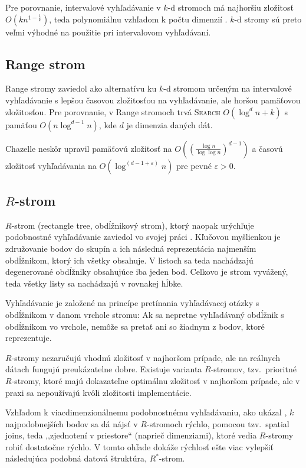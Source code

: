 \documentclass[12pt,a4paper,oneside]{article}
\begin{document}
{Pre porovnanie, intervalové vyhľadávanie v $k$-d stromoch má najhoršiu zložitosť $O(kn^{1-\frac{1}{k}})$, teda polynomiálnu vzhľadom k počtu dimenzií \citep{lee77}. $k$-d stromy sú preto veľmi výhodné na použitie pri intervalovom vyhľadávaní.

\subsection{Range strom}\label{rangetree}

Range stromy zaviedol \citet{Bentley79} ako alternatívu ku $k$-d stromom určeným na intervalové vyhľadávanie s lepšou časovou zložitosťou na vyhľadávanie, ale horšou pamäťovou zložitosťou. Pre porovnanie, v Range stromoch trvá \textsc{Search} $O(\log^d n + k)$ s pamäťou $O(n \log^{d-1} n)$, kde $d$ je dimenzia daných dát.

Chazelle neskôr upravil pamäťovú zložitosť na $O\left(\left(\frac{\log n}{\log \log n}\right)^{d-1}\right)$\citep{chazelle90p1}
a časovú zložitosť vyhľadávania na $O(\log^{(d-1+\varepsilon)} n)$\citep{chazelle90p2} pre pevné $\varepsilon > 0$.

\subsection{$R$-strom}\label{rtree}

$R$-strom (rectangle tree, obdĺžnikový strom), ktorý naopak urýchľuje podobnostné vyhľadávanie zaviedol vo svojej práci \citet{Guttman84}.
Kľučovou myšlienkou je združovanie bodov do skupín a ich následná reprezentácia najmenším obdĺžnikom, ktorý ich všetky obsahuje. V listoch sa teda nachádzajú degenerované obdĺžniky obsahujúce iba jeden bod. Celkovo je strom vyvážený, teda všetky listy sa nachádzajú v rovnakej hĺbke.

Vyhľadávanie je založené na princípe pretínania vyhľadávacej otázky s obdĺžnikom v danom vrchole stromu: Ak sa nepretne vyhľadávaný obdĺžnik s obdĺžnikom vo vrchole, nemôže sa pretať ani so žiadnym z bodov, ktoré reprezentuje.

$R$-stromy nezaručujú vhodnú zložitosť v najhoršom prípade, ale na reálnych dátach fungujú preukázatelne \citep{Hwang03} dobre. Existuje varianta $R$-stromov, tzv.~prioritné $R$-stromy, ktoré majú dokazateľne optimálnu zložitosť v najhoršom prípade, ale v praxi sa nepoužívajú kvôli zložitosti implementácie.

Vzhľadom k viacdimenzionálnemu podobnostnému vyhľadávaniu, ako ukázal \citet{brinkhoff93}, 
$k$ najpodobnejších bodov sa dá nájsť v $R$-stromoch rýchlo, pomocou tzv.~spatial joins, teda ,,zjednotení v priestore`` (naprieč dimenziami), ktoré vedia $R$-stromy robiť dostatočne rýchlo. V tomto ohľade dokáže rýchlosť ešte viac vylepšiť následujúca podobná datová štruktúra, $R^*$-strom.

}
\end{document}

